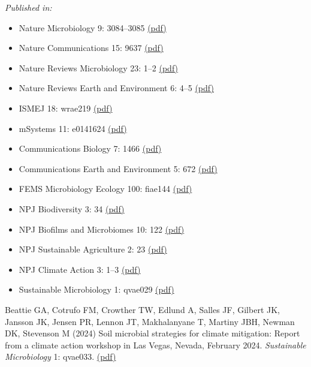 \documentclass[11pt]{article}
\begin{document}
\begin{etaremune}
\textit{Published in:}
\begin{itemize}
  \item Nature Microbiology 9: 3084–3085 \href{https://lennonlab.github.io/assets/publications/Peixoto_etal_2024a.pdf}{(pdf)}
  \item Nature Communications 15: 9637 \href{https://lennonlab.github.io/assets/publications/Peixoto_etal_2024b.pdf}{(pdf)}
  \item Nature Reviews Microbiology 23: 1–2 \href{https://lennonlab.github.io/assets/publications/Peixoto_etal_2024c.pdf}{(pdf)}
  \item Nature Reviews Earth and Environment 6: 4–5 \href{https://lennonlab.github.io/assets/publications/Peixoto_etal_2024d.pdf}{(pdf)}
  \item ISMEJ 18: wrae219 \href{https://lennonlab.github.io/assets/publications/Peixoto_etal_2024e.pdf}{(pdf)}
  \item mSystems 11: e0141624 \href{https://lennonlab.github.io/assets/publications/Peixoto_etal_2024f.pdf}{(pdf)}
  \item Communications Biology 7: 1466 \href{https://lennonlab.github.io/assets/publications/Peixoto_etal_2024g.pdf}{(pdf)}
  \item Communications Earth and Environment 5: 672 \href{https://lennonlab.github.io/assets/publications/Peixoto_etal_2024h.pdf}{(pdf)}
  \item FEMS Microbiology Ecology 100: fiae144 \href{https://lennonlab.github.io/assets/publications/Peixoto_etal_2024i.pdf}{(pdf)}
  \item NPJ Biodiversity 3: 34 \href{https://lennonlab.github.io/assets/publications/Peixoto_etal_2024j.pdf}{(pdf)}
  \item NPJ Biofilms and Microbiomes 10: 122 \href{https://lennonlab.github.io/assets/publications/Peixoto_etal_2024k.pdf}{(pdf)}
  \item NPJ Sustainable Agriculture 2: 23 \href{https://lennonlab.github.io/assets/publications/Peixoto_etal_2024l.pdf}{(pdf)}
  \item NPJ Climate Action 3: 1–3 \href{https://lennonlab.github.io/assets/publications/Peixoto_etal_2024m.pdf}{(pdf)}
  \item Sustainable Microbiology 1: qvae029 \href{https://lennonlab.github.io/assets/publications/Peixoto_etal_2024n.pdf}{(pdf)}
\end{itemize}

\item Beattie GA, Cotrufo FM, Crowther TW, Edlund A, Salles JF, Gilbert JK, Jansson JK, Jensen PR, Lennon JT, Makhalanyane T, Martiny JBH, Newman DK, Stevenson M (2024) Soil microbial strategies for climate mitigation: Report from a climate action workshop in Las Vegas, Nevada, February 2024. \textit{Sustainable Microbiology} 1: qvae033. \href{https://lennonlab.github.io/assets/publications/Beattie_etal_2024.pdf}{(pdf)}


\end{etaremune}
\end{document}
